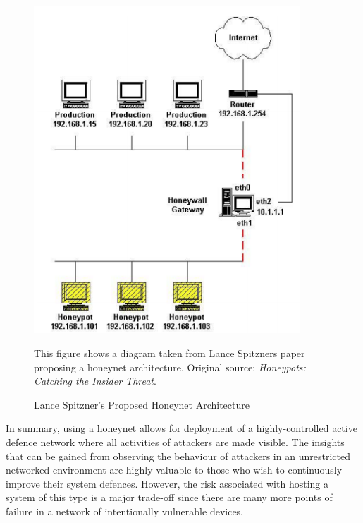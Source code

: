 \begin{figure}[ht]
      \centering
      \includegraphics[width=100mm, scale=0.6]{Images/honey-wall-without-meta-data.png}
      \caption{Lance Spitzner's Proposed Honeynet Architecture}
      \medskip
	  \small
		This figure shows a diagram taken from Lance Spitzners paper proposing a honeynet architecture. Original source: \textit{Honeypots: Catching the Insider Threat}. \cite{Spitzner:2003:HCI:956415.956438}     
\end{figure}

In summary, using a honeynet allows for deployment of a highly-controlled active defence network where all activities of attackers are made visible. The insights that can be gained from observing the behaviour of attackers in an unrestricted networked environment are highly valuable to those who wish to continuously improve their system defences. However, the risk associated with hosting a system of this type is a major trade-off since there are many more points of failure in a network of intentionally vulnerable devices.



